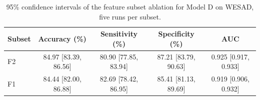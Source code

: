 \begin{table}[h!]
\centering
\footnotesize
\begin{tabular}{|l|c|c|c|c|}
\hline
\textbf{Subset} & \textbf{Accuracy (\%)} & \textbf{Sensitivity (\%)} & \textbf{Specificity (\%)} & \textbf{AUC} \\ \hline
F2 & 84.97 [83.39, 86.56] & 80.90 [77.85, 83.94] & 87.21 [83.79, 90.63] & 0.925 [0.917, 0.933] \\ \hline
F1 & 84.44 [82.00, 86.88] & 82.69 [78.42, 86.95] & 85.41 [81.13, 89.69] & 0.919 [0.906, 0.932] \\ \hline
\end{tabular}
\caption{95\% confidence intervals of the feature subset ablation for Model D on WESAD, five runs per subset.}
\label{tab:ci_ablation}
\end{table}
